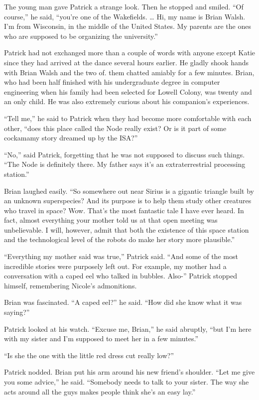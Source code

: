 \documentclass[]{article}
\begin{document}
{The young man gave Patrick a strange look.  Then he stopped and smiled.  “Of course,” he said, “you’re one of the Wakefields.  … Hi, my name is Brian Walsh.  I’m from Wisconsin, in the middle of the United States.  My parents are the ones who are supposed to be organizing the university.”

Patrick had not exchanged more than a couple of words with anyone except Katie since they had arrived at the dance several hours earlier.  He gladly shook hands with Brian Walsh and the two of.  them chatted amiably for a few minutes.  Brian, who had been half finished with his undergraduate degree in computer engineering when his family had been selected for Lowell Colony, was twenty and an only child.  He was also extremely curious about his companion’s experiences.

“Tell me,” he said to Patrick when they had become more comfortable with each other, “does this place called the Node really exist? Or is it part of some cockamamy story dreamed up by the ISA?”

“No,” said Patrick, forgetting that he was not supposed to discuss such things.  “The Node is definitely there.  My father says it’s an extraterrestrial processing station.”

Brian laughed easily.  “So somewhere out near Sirius is a gigantic triangle built by an unknown superspecies? And its purpose is to help them study other creatures who travel in space? Wow.  That’s the most fantastic tale I have ever heard.  In fact, almost everything your mother told us at that open meeting was unbelievable.  I will, however, admit that both the existence of this space station and the technological level of the robots do make her story more plausible.”

“Everything my mother said was true,” Patrick said.  “And some of the most incredible stories were purposely left out.  For example, my mother had a conversation with a caped eel who talked in bubbles.  Also-” Patrick stopped himself, remembering Nicole’s admonitions.

Brian was fascinated.  “A caped eel?” he said.  “How did she know what it was saying?”

Patrick looked at his watch.  “Excuse me, Brian,” he said abruptly, “but I’m here with my sister and I’m supposed to meet her in a few minutes.”

“Is she the one with the little red dress cut really low?”

Patrick nodded.  Brian put his arm around his new friend’s shoulder.  “Let me give you some advice,” he said.  “Somebody needs to talk to your sister.  The way she acts around all the guys makes people think she’s an easy lay.”

}
\end{document}
